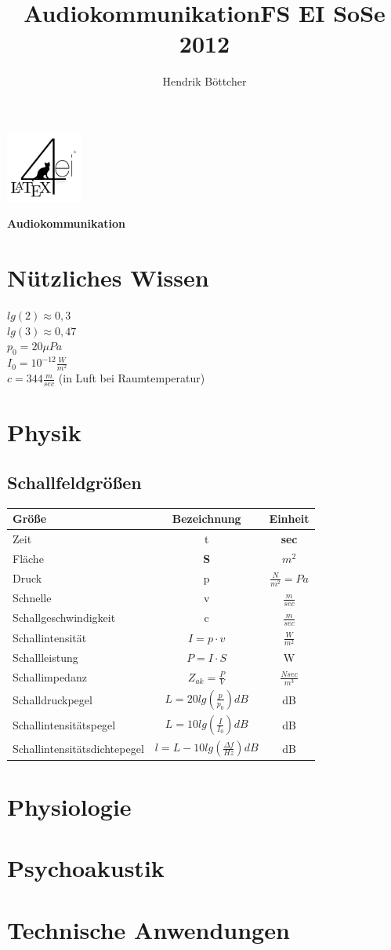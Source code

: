 \documentclass[9pt,a4paper]{scrartcl}
\title{AudiokommunikationFS EI SoSe 2012}
\author{Hendrik Böttcher}
\renewcommand{\emph}[1]{\textbf{#1}}															%
\begin{document}
\begin{multicols}{3}
	\parbox{2.3cm}{
		\includegraphics[height=2.3cm]{./img/Logo.pdf}		
	}
	\parbox{4cm}{
		\emph{\Large{Audiokommunikation}}
	}

\section{Nützliches Wissen}
$lg(2) \approx 0{,}3$\\
$lg(3) \approx 0{,}47$\\
$p_0 = 20 \mu Pa$\\
$I_0 = 10^{-12} \frac{W}{m^2}$\\
$c = 344 \frac m {sec}$ (in Luft bei Raumtemperatur)\\

\section{Physik}
\subsection{Schallfeldgrößen}
\begin{tabular}{l|c|c}
Größe & Bezeichnung & Einheit\\ \hline
Zeit & t & \emph{sec}\\
Fläche & \emph{S} & $m^2$\\
Druck & p & $\frac{N}{m^{2}}=Pa$\\
Schnelle & v & $\frac{m}{sec}$\\
Schallgeschwindigkeit & c & $\frac{m}{sec}$\\
Schallintensität & $I=p\cdot v$&$\frac{W}{m^{2}}$\\
Schallleistung & $P=I\cdot S$ & W\\
Schallimpedanz & $Z_{ak}=\frac{P}{V}$& $\frac{N sec}{m^3}$ \\
Schalldruckpegel &  $L=20 lg(\frac{p}{p_0}) dB$ & dB \\
Schallintensitätspegel & $L=10 lg(\frac{I}{I_0}) dB$ &dB\\
Schallintensitätsdichtepegel & $l= L-10 lg(\frac{\Delta f}{Hz}) dB$ & dB\\
\end{tabular}
\section{Physiologie}
\section{Psychoakustik}
\section{Technische Anwendungen}

\end{multicols}

\end{document}
